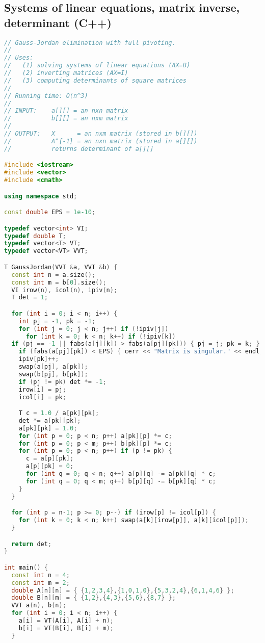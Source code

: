 \subsection{Systems of linear equations, matrix inverse, determinant (C++)}
\begin{lstlisting}[language=C++]
// Gauss-Jordan elimination with full pivoting.
//
// Uses:
//   (1) solving systems of linear equations (AX=B)
//   (2) inverting matrices (AX=I)
//   (3) computing determinants of square matrices
//
// Running time: O(n^3)
//
// INPUT:    a[][] = an nxn matrix
//           b[][] = an nxm matrix
//
// OUTPUT:   X      = an nxm matrix (stored in b[][])
//           A^{-1} = an nxn matrix (stored in a[][])
//           returns determinant of a[][]

#include <iostream>
#include <vector>
#include <cmath>

using namespace std;

const double EPS = 1e-10;

typedef vector<int> VI;
typedef double T;
typedef vector<T> VT;
typedef vector<VT> VVT;

T GaussJordan(VVT &a, VVT &b) {
  const int n = a.size();
  const int m = b[0].size();
  VI irow(n), icol(n), ipiv(n);
  T det = 1;

  for (int i = 0; i < n; i++) {
    int pj = -1, pk = -1;
    for (int j = 0; j < n; j++) if (!ipiv[j])
      for (int k = 0; k < n; k++) if (!ipiv[k])
  if (pj == -1 || fabs(a[j][k]) > fabs(a[pj][pk])) { pj = j; pk = k; }
    if (fabs(a[pj][pk]) < EPS) { cerr << "Matrix is singular." << endl; exit(0); }
    ipiv[pk]++;
    swap(a[pj], a[pk]);
    swap(b[pj], b[pk]);
    if (pj != pk) det *= -1;
    irow[i] = pj;
    icol[i] = pk;

    T c = 1.0 / a[pk][pk];
    det *= a[pk][pk];
    a[pk][pk] = 1.0;
    for (int p = 0; p < n; p++) a[pk][p] *= c;
    for (int p = 0; p < m; p++) b[pk][p] *= c;
    for (int p = 0; p < n; p++) if (p != pk) {
      c = a[p][pk];
      a[p][pk] = 0;
      for (int q = 0; q < n; q++) a[p][q] -= a[pk][q] * c;
      for (int q = 0; q < m; q++) b[p][q] -= b[pk][q] * c;      
    }
  }

  for (int p = n-1; p >= 0; p--) if (irow[p] != icol[p]) {
    for (int k = 0; k < n; k++) swap(a[k][irow[p]], a[k][icol[p]]);
  }

  return det;
}

int main() {
  const int n = 4;
  const int m = 2;
  double A[n][n] = { {1,2,3,4},{1,0,1,0},{5,3,2,4},{6,1,4,6} };
  double B[n][m] = { {1,2},{4,3},{5,6},{8,7} };
  VVT a(n), b(n);
  for (int i = 0; i < n; i++) {
    a[i] = VT(A[i], A[i] + n);
    b[i] = VT(B[i], B[i] + m);
  }
  

\end{lstlisting}
